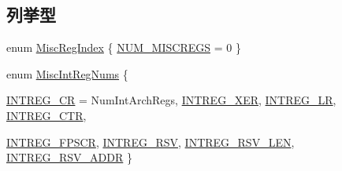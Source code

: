 \subsection*{列挙型}
\begin{DoxyCompactItemize}
\item 
enum \hyperlink{namespacePowerISA_a1e522017e015d4c7efd6b2360143aa67}{MiscRegIndex} \{ \hyperlink{namespacePowerISA_a1e522017e015d4c7efd6b2360143aa67a7d1d86545746c83e719e24556985648a}{NUM\_\-MISCREGS} =  0
 \}
\item 
enum \hyperlink{namespacePowerISA_a9969c99e14b7b491ae9e3751404cc6a1}{MiscIntRegNums} \{ \par
\hyperlink{namespacePowerISA_a9969c99e14b7b491ae9e3751404cc6a1a79e9736c7fb322ead9b19971e3cc056b}{INTREG\_\-CR} =  NumIntArchRegs, 
\hyperlink{namespacePowerISA_a9969c99e14b7b491ae9e3751404cc6a1ae6a531992e38e3a8471432458db39a9b}{INTREG\_\-XER}, 
\hyperlink{namespacePowerISA_a9969c99e14b7b491ae9e3751404cc6a1a16ad869dde5202f3570c4f6b7fe33440}{INTREG\_\-LR}, 
\hyperlink{namespacePowerISA_a9969c99e14b7b491ae9e3751404cc6a1a84d0734633f7e5576d1dbdbac88e111d}{INTREG\_\-CTR}, 
\par
\hyperlink{namespacePowerISA_a9969c99e14b7b491ae9e3751404cc6a1af24363447addc48de14b9ed1ca9a8617}{INTREG\_\-FPSCR}, 
\hyperlink{namespacePowerISA_a9969c99e14b7b491ae9e3751404cc6a1ac6ab3bece297fc03ad48e1f2e54c2814}{INTREG\_\-RSV}, 
\hyperlink{namespacePowerISA_a9969c99e14b7b491ae9e3751404cc6a1a0d4c3467b31d839eddc5fee40218ae58}{INTREG\_\-RSV\_\-LEN}, 
\hyperlink{namespacePowerISA_a9969c99e14b7b491ae9e3751404cc6a1a5872a0b2feef4ede9d5614db9649c648}{INTREG\_\-RSV\_\-ADDR}
 \}
\end{DoxyCompactItemize}
